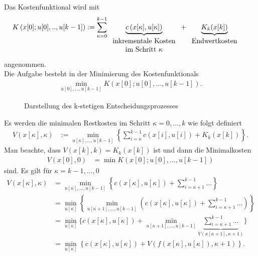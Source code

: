 Das Kostenfunktional wird mit
\begin{align}
	K\left(x[0];u[0],..,u[k-1] \right) & := \sum\limits_{\kappa=0}^{k-1}\underbrace{c\left(x[\kappa],u[\kappa] \right)}_{\begin{tabular}{c}inkrementale
	Kosten\\ im Schritt $\kappa$\end{tabular}} + \underbrace{K_k(x[k])}_{\begin{tabular}{c}Endwertkosten\end{tabular}}
\end{align}
angenommen.\\
Die Aufgabe besteht in der Minimierung des Kostenfunktionals
\begin{align}
	\min\limits_{u[0],\ldots,u[k-1]}K\left(x[0];u[0],\ldots,u[k-1]\right).
\end{align}
\begin{figure}[htb]
	\centering
	
	\caption{Darstellung des k-stetigen Entscheidungsprozesses}
	\label{fig:kap_3_entscheidungsprozess}
\end{figure}
Es werden die minimalen Restkosten im Schritt $\kappa=0,\ldots,k$ wie folgt definiert 
\begin{align}
	V\left(x[\kappa],\kappa \right) & := \min\limits_{u[\kappa],\ldots,u[k-1]}\left\{\sum\limits_{i=\kappa}^{k-1} c\left(x[i],u[i] \right) +
	K_k(x[k])\right\}.
\end{align}
Man beachte, dass $V\left(x[k],k\right)=K_k(x[k])$ ist und dann die Minimalkosten
\begin{align*}
	V\left(x[0],0 \right) & = \min K\left(x[0];u[0],\ldots,u[k-1] \right)
\end{align*}
sind. Es gilt für $\kappa=k-1,\ldots,0$
\begin{align}
	V\left(x[\kappa],\kappa \right) & = \min\limits_{u[\kappa],\ldots,u[k-1]}\left\{ c\left(x[\kappa],u[\kappa] \right)+\sum\limits_{i=\kappa+1}^{k-1} \ldots
	\right\}\\
	& = \min\limits_{u[\kappa]}\left\{\min\limits_{u[\kappa + 1],\ldots,u[k-1]}\left(c\left(x[\kappa],u[\kappa] \right) + \sum\limits_{i=\kappa +
	1}^{k-1} \ldots\right) \right\}\\
	& = \min\limits_{u[\kappa]}\Bigg\{c\left(x[\kappa], u[\kappa] \right) + \min\limits_{u[\kappa
	+1],\ldots,u[k-1]}\underbrace{\sum\limits_{i=\kappa+1}^{k-1}\ldots}_{V\left(x[\kappa+1],\kappa+1 \right)} \Bigg\}\\
	& = \min\limits_{u[\kappa]}\left\{c\left(x[\kappa],u[\kappa] \right)+V\left(f\left(x[\kappa],u[\kappa] \right),\kappa+1 \right)
	\right\}.\label{eqn:kap_3_dp}
\end{align}
